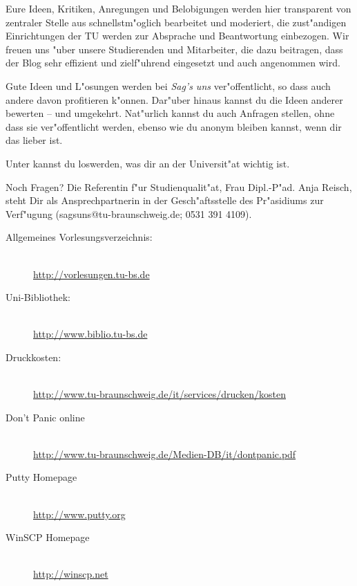 Eure Ideen, Kritiken, Anregungen und Belobigungen werden hier transparent von zentraler Stelle aus schnellstm"oglich bearbeitet und moderiert, die zust"andigen Einrichtungen der TU werden zur Absprache und Beantwortung einbezogen. 
Wir freuen uns "uber unsere Studierenden und Mitarbeiter, die dazu beitragen, dass der Blog sehr effizient und zielf"uhrend eingesetzt und auch angenommen wird.

Gute Ideen und L"osungen werden bei \emph{Sag's uns} ver"offentlicht, so dass auch andere davon profitieren k"onnen.
Dar"uber hinaus kannst du die Ideen anderer bewerten – und umgekehrt. Nat"urlich kannst du auch Anfragen stellen, ohne dass sie ver"offentlicht werden, ebenso wie du anonym bleiben kannst, wenn dir das lieber ist.

Unter  kannst du loswerden, was dir an der Universit"at wichtig ist.

Noch Fragen? Die Referentin f"ur Studienqualit"at, Frau Dipl.-P"ad. Anja Reisch, steht Dir als Ansprechpartnerin in der Gesch"aftsstelle des Pr"asidiums zur Verf"ugung (sagsuns@tu-braunschweig.de; 0531 391 4109).

\begin{description}
\item[Allgemeines Vorlesungsverzeichnis:] ~\\
{\footnotesize\url{http://vorlesungen.tu-bs.de}}
\item[Uni-Bibliothek:] ~\\
{\footnotesize\url{http://www.biblio.tu-bs.de}}
\item[Druckkosten:] ~\\
{\footnotesize\url{http://www.tu-braunschweig.de/it/services/drucken/kosten}}
\item[Don't Panic online] ~\\
{\footnotesize\url{http://www.tu-braunschweig.de/Medien-DB/it/dontpanic.pdf}}
\item[Putty Homepage] ~\\
{\footnotesize\url{http://www.putty.org}}
\item[WinSCP Homepage] ~\\
{\footnotesize\url{http://winscp.net}}
\end{description}
